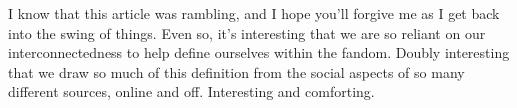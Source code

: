 I know that this article was rambling, and I hope you'll forgive me as I get back into the swing of things.  Even so, it's interesting that we are so reliant on our interconnectedness to help define ourselves within the fandom.  Doubly interesting that we draw so much of this definition from the social aspects of so many different sources, online and off.  Interesting and comforting.
